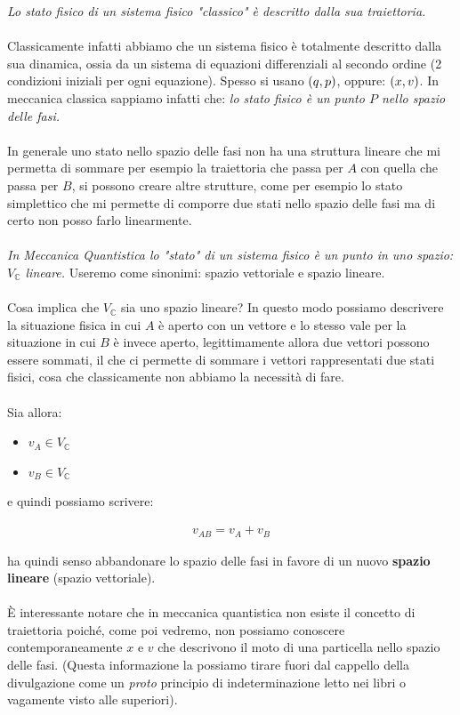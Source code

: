 	\textit{Lo stato fisico di un sistema fisico "classico" è descritto dalla sua traiettoria.}
\\
\\
	Classicamente infatti abbiamo che un sistema fisico è totalmente descritto dalla sua dinamica, ossia da un sistema di equazioni differenziali al secondo ordine (2 condizioni iniziali per ogni equazione). Spesso si usano $\qty(q, p)$, oppure: $\qty(x, v)$. In meccanica classica sappiamo infatti che: \textit{lo stato fisico è un punto $P$ nello spazio delle fasi.}
	\\
	\\
	In generale uno stato nello spazio delle fasi non ha una struttura lineare che mi permetta di sommare per esempio la traiettoria che passa per $A$ con quella che passa per $B$, si possono creare altre strutture, come per esempio lo stato simplettico che mi permette di comporre due stati nello spazio delle fasi ma di certo non posso farlo linearmente.
	\\
	\\
	\textit{In Meccanica Quantistica lo "stato" di un sistema fisico è un punto in uno spazio: $V_{\mathbb{C}}$ lineare.} Useremo come sinonimi: spazio vettoriale e spazio lineare.
	\\
	\\
	Cosa implica che $V_{\mathbb{C}}$ sia uno spazio lineare? In questo modo possiamo descrivere la situazione fisica in cui $A$ è aperto con un vettore e lo stesso vale per la situazione in cui $B$ è invece aperto, legittimamente allora due vettori possono essere sommati, il che ci permette di sommare i vettori rappresentati due stati fisici, cosa che classicamente non abbiamo la necessità di fare.
	\\
	\\
	Sia allora:

\begin{itemize}
	\item $ v_A \in V_{\mathbb{C}} $
	\item $v_B \in V_{\mathbb{C}} $ 
\end{itemize} 

	e quindi possiamo scrivere:
	
\begin{align*}
	v_{AB} = v_A + v_B
\end{align*}

	ha quindi senso abbandonare lo spazio delle fasi in favore di un nuovo \textbf{spazio lineare} (spazio vettoriale).
	\\
	\\
	È interessante notare che in meccanica quantistica non esiste il concetto di traiettoria poiché, come poi vedremo, non possiamo conoscere contemporaneamente $x$ e $v$ che descrivono il moto di una particella nello spazio delle fasi. (Questa informazione la possiamo tirare fuori dal cappello della divulgazione come un \textit{proto} principio di indeterminazione letto nei libri o vagamente visto alle superiori).


